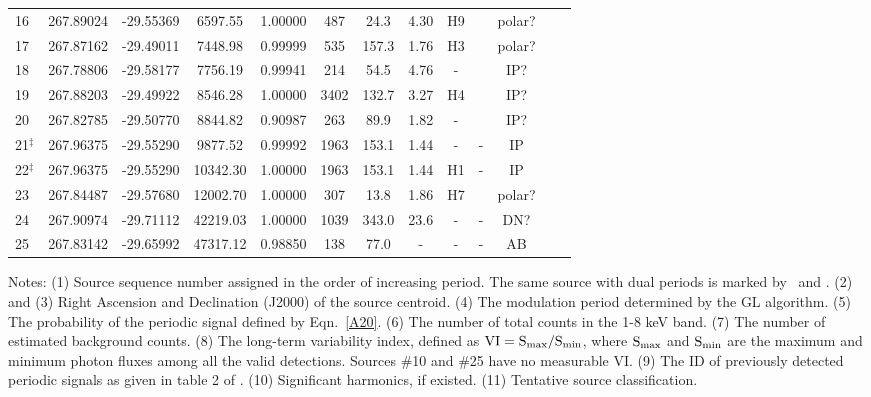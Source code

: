 \documentclass[fleqn,usenatbib]{mnras}
\begin{document}
\begin{table}
\begin{threeparttable}
\begin{tabular}{lcccccccccccc}
\\
16 & 267.89024 &	 -29.55369 & 6597.55 & 1.00000 & 487 & 24.3 & 4.30  & H9  & \text{Second} & polar?
\\ 
17 & 267.87162 &	 -29.49011 & 7448.98 & 0.99999  & 535 & 157.3 & 1.76  & H3 & \text{Second} & polar?
\\
18 & 267.78806 &	 -29.58177 & 7756.19 & 0.99941 & 214 & 54.5 & 4.76 &- &\text{Second} & IP?
\\
19 & 267.88203 &	 -29.49922 & 8546.28 & 1.00000  & 3402  & 132.7 & 3.27 &H4  & \text{Second} & IP?
\\
20 & 267.82785 &	 -29.50770 & 8844.82 & 0.90987 & 263 & 89.9 & 1.82
	&-  & \text{Second} & IP?
\\
21$^\ddag$ & 267.96375 & -29.55290 & 9877.52 & 0.99992  & 1963 & 153.1 & 1.44 & - &- & IP
\\
22$^\ddag$ & 267.96375 & -29.55290 & 10342.30 & 1.00000 & 1963 & 153.1 & 1.44 & H1  &- & IP 
\\
23 & 267.84487 &	 -29.57680 & 12002.70 & 1.00000 & 307 & 13.8 & 1.86 & H7 & \text{Second} & polar?
\\
24 & 267.90974 &	-29.71112 & 42219.03 & 1.00000  &1039 &343.0 &23.6  &- &- & DN?
\\
25 & 267.83142 &	 -29.65992 & 47317.12 & 0.98850 & 138 &77.0  &- &- &- & AB
\\
\hline
\end{tabular}
\begin{tablenotes}
      \small
      \item 
      Notes:
      (1) Source sequence number assigned in the order of increasing period. The same source with dual periods is marked by \dag\ and \ddag. 
(2) and (3) Right Ascension and Declination (J2000) of the source centroid. 
(4) The modulation period determined by the GL algorithm.
(5) The probability of the periodic signal defined by Eqn.~\ref{A20}.  
(6) The number of total counts in the 1-8 keV band.
(7) The number of estimated background counts.
(8) The long-term variability index, defined as $\rm VI=S_{max}/S_{min}$, where $\rm S_{max}$ and $\rm S_{min}$ are the maximum and minimum photon fluxes among all the valid detections. Sources \#10 and \#25 have no measurable VI.
(9) The ID of previously detected periodic signals as given in table 2 of \cite{2012ApJ...746..165H}.
(10) Significant harmonics, if existed.
(11) Tentative source classification.
\end{tablenotes}
\end{threeparttable}
\end{table}
\end{document}
